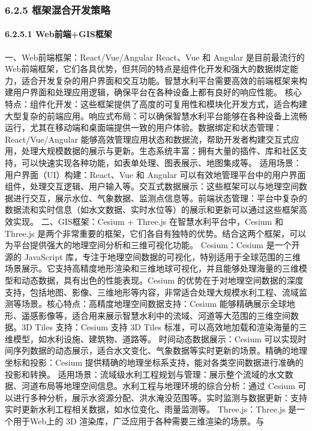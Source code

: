 {\subsubsection{6.2.5 框架混合开发策略}\label{ux6846ux67b6ux6df7ux5408ux5f00ux53d1ux7b56ux7565} \paragraph{6.2.5.1
Web前端+GIS框架}\label{webux524dux7aefgisux6846ux67b6} 一、Web前端框架：React/Vue/Angular React、Vue 和 Angular
是目前最流行的Web前端框架，它们各具优势，但共同的特点是组件化开发和强大的数据绑定能力，适合开发复杂的用户界面和交互功能。智慧水利平台需要高效的前端框架来构建用户界面和处理应用逻辑，确保平台在各种设备上都有良好的响应性能。
核心特点：组件化开发：这些框架提供了高度的可复用性和模块化开发方式，适合构建大型复杂的前端应用。响应式布局：可以确保智慧水利平台能够在各种设备上流畅运行，尤其在移动端和桌面端提供一致的用户体验。数据绑定和状态管理：React/Vue/Angular
能够高效管理应用状态和数据流，帮助开发者构建交互式应用，处理大规模数据的展示与更新。生态系统丰富：拥有大量的插件、库和社区支持，可以快速实现各种功能，如表单处理、图表展示、地图集成等。 适用场景：用户界面（UI）构建：React、Vue 和
Angular
可以有效地管理平台中的用户界面组件，处理交互逻辑、用户输入等。交互式数据展示：这些框架可以与地理空间数据进行交互，展示水位、气象数据、监测点信息等。前端状态管理：平台中复杂的数据流和实时信息（如水文数据、实时水位等）的展示和更新可以通过这些框架高效实现。
二、GIS框架：Cesium + Three.js 在智慧水利平台中，Cesium 和 Three.js 是两个非常重要的框架，它们各自有独特的优势。结合这两个框架，可以为平台提供强大的地理空间分析和三维可视化功能。
Cesium：Cesium 是一个开源的 JavaScript 库，专注于地理空间数据的可视化，特别适用于全球范围的三维场景展示。它支持高精度地形渲染和三维地球可视化，并且能够处理海量的三维模型和动态数据，具有出色的性能表现。Cesium
的优势在于对地理空间数据的深度支持，包括地图、影像、三维地形等内容，非常适合处理大规模水利工程、流域监测等场景。核心特点：高精度地理空间数据支持：Cesium
能够精确展示全球地形、遥感影像等，适合用来展示智慧水利中的流域、河道等大范围的三维空间数据。3D Tiles 支持：Cesium 支持 3D Tiles 标准，可以高效地加载和渲染海量的三维模型，如水利设施、建筑物、道路等。
时间动态数据展示：Cesium 可以实现时间序列数据的动态展示，适合水文变化、气象数据等实时更新的场景。精确的地理坐标和投影：Cesium 提供精确的地理坐标系支持，能对各类空间数据进行准确的投影和转换。
适用场景：流域级水利工程规划与管理：展示整个流域的水文数据、河道布局等地理空间信息。水利工程与地理环境的综合分析：通过 Cesium
可以进行多种分析，展示水资源分配、洪水淹没范围等。实时监测与数据更新：支持实时更新水利工程相关数据，如水位变化、雨量监测等。 Three.js：Three.js 是一个用于Web上的 3D 渲染库，广泛应用于各种需要三维渲染的场景。与
}
